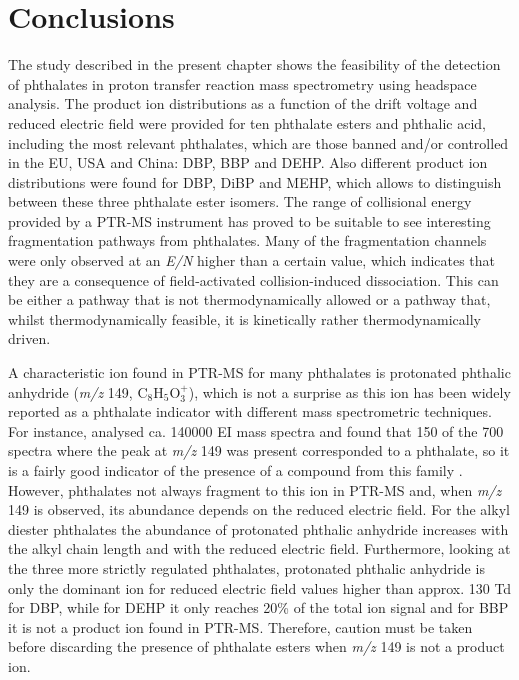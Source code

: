 \section{Conclusions}
The study described in the present chapter shows the feasibility of the detection of phthalates in proton transfer reaction mass spectrometry using headspace analysis. 
%
The product ion distributions as a function of the drift voltage and reduced electric field were provided for ten phthalate esters and phthalic acid, including the most relevant phthalates, which are those banned and/or controlled in the EU, USA and China: DBP, BBP and DEHP.
%
Also different product ion distributions were found for  DBP, DiBP and MEHP, which allows to distinguish between these three phthalate ester isomers.
%
The range of collisional energy provided by a PTR-MS instrument has proved to be suitable to see interesting fragmentation pathways from phthalates.
%
Many of the fragmentation channels were only observed at an \textit{E/N} higher than a certain value, which indicates that they are a consequence of field-activated collision-induced dissociation.
%
This can be either a pathway that is not thermodynamically allowed or a pathway that, whilst thermodynamically feasible, it is kinetically rather thermodynamically driven.


A characteristic ion found in PTR-MS for many phthalates is protonated phthalic anhydride (\textit{m/z} 149, C$_8$H$_5$O$_3^+$), which is not a surprise as this ion has been widely reported as a phthalate indicator with different mass spectrometric techniques. 
For instance, \citeauthor{mclafferty1989registry} analysed  ca. 140000  EI mass spectra and found that 150 of the 700 spectra where the peak at \textit{m/z} 149  was present corresponded to a phthalate,  so it is a fairly good indicator of the presence of a compound from this family \cite{mclafferty1993interpretation,mclafferty1989registry}. 
%
However, phthalates not always fragment to this ion in PTR-MS and, when \textit{m/z} 149 is observed, its abundance depends on  the reduced electric field. For the alkyl diester phthalates the abundance of protonated phthalic anhydride  increases with the alkyl chain length and with the reduced electric field.
%
Furthermore, looking at the three more strictly regulated phthalates, protonated phthalic anhydride is only the dominant ion for reduced electric field values higher than approx. 130 Td for DBP, while for DEHP it  only reaches  20\% of the total ion signal and for BBP it is not a product ion found in PTR-MS.
%
Therefore, %
caution must be taken before discarding the presence of phthalate esters when \textit{m/z} 149 is not a product ion.





